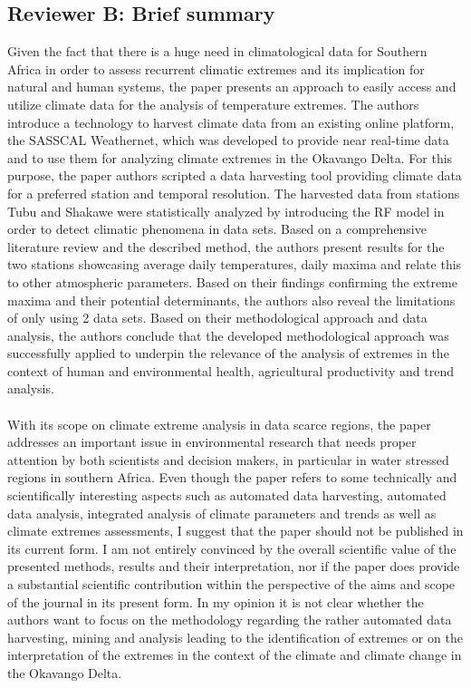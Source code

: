 \documentclass[a4paper, 12pt, conference]{ieeeconf}      %
\begin{document}
	\subsection{\textbf{Reviewer B:} Brief summary}
	 Given the fact that there is a huge need in climatological data for Southern Africa in order to assess recurrent climatic extremes and its implication for natural and human systems, the paper presents an approach to easily access and utilize climate data for the analysis of temperature extremes. The authors introduce a technology to harvest climate data from an existing online platform, the SASSCAL Weathernet, which was developed to provide near real-time data and to use them for analyzing climate extremes in the Okavango Delta. For this purpose, the paper authors scripted a data harvesting tool providing climate data for a preferred station and temporal resolution. The harvested data from stations Tubu and Shakawe were statistically analyzed by introducing the RF model in order to detect climatic phenomena in data sets. Based on a comprehensive literature review and the described method, the authors present results for the two stations showcasing average daily temperatures, daily maxima and relate this to other atmospheric parameters. Based on their findings confirming the extreme maxima and their potential determinants, the authors also reveal the limitations of only using 2 data sets. Based on their methodological approach and data analysis, the authors conclude that the developed methodological approach was successfully applied to underpin the relevance of the analysis of extremes in the context of human and environmental health, agricultural productivity and trend analysis. \\
	 \\
	 With its scope on climate extreme analysis in data scarce regions, the paper addresses an important issue in environmental research that needs proper attention by both scientists and decision makers, in particular in water stressed regions in southern Africa. Even though the paper refers to some technically and scientifically interesting aspects such as automated data harvesting, automated data analysis, integrated analysis of climate parameters and trends as well as climate extremes assessments, I suggest that the paper should not be published in its current form. I am not entirely convinced by the overall scientific value of the presented methods, results and their interpretation, nor if the paper does provide a substantial scientific contribution within the perspective of the aims and scope of the journal in its present form. In my opinion it is not clear whether the authors want to focus on the methodology regarding the rather automated data harvesting, mining and analysis leading to the identification of extremes or on the interpretation of the extremes in the context of the climate and climate change in the Okavango Delta.
	 
\end{document}
